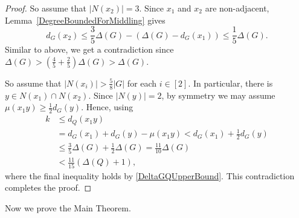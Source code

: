 \documentclass[12pt]{article}
\theoremstyle{plain}
\theoremstyle{definition}
\theoremstyle{remark}
\newcommand{\card}[1]{\left|#1\right|}
\newcommand{\irange}[1]{\left[#1\right]}
\begin{document}
\begin{proof}
So assume that $\card{N(x_2)}=3$.
Since $x_1$ and $x_2$ are non-adjacent, 
Lemma~\ref{DegreeBoundedForMiddling} gives \[d_G(x_2) \le \frac35\Delta(G) -
(\Delta(G) - d_G(x_1)) \le \frac15\Delta(G).\] 
Similar to above, we get a contradiction since $\Delta(G)>\left(\frac45 +
\frac25\right)\Delta(G) > \Delta(G)$. 

So assume that $\card{N(x_i)} > \frac58\card{G}$ for each $i \in \irange{2}$. 
In particular, there is $y \in N(x_1) \cap N(x_2)$.  Since $\card{N(y)} = 2$,
by symmetry we may assume $\mu(x_1y) \ge \frac12 d_G(y)$.  Hence, using
\begin{align*}
k &\le d_Q(x_1y) \\
&= d_G(x_1) + d_G(y) - \mu(x_1y) < d_G(x_1) + \frac12d_G(y) \\
&\le \frac35\Delta(G)+\frac12\Delta(G)=\frac{11}{10}\Delta(G) \\
&< \frac{11}{15}(\Delta(Q) + 1),
\end{align*}
where the final inequality holds by \eqref{DeltaGQUpperBound}.
This contradiction completes the proof.
\end{proof}

Now we prove the Main Theorem.
\end{document}
